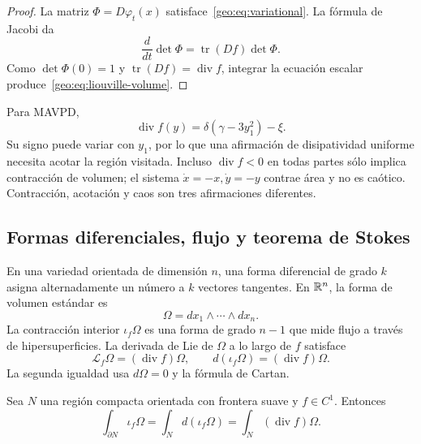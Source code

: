 \begin{proof}
La matriz \(\Phi=D\varphi_t(x)\) satisface~\eqref{geo:eq:variational}. La
fórmula de Jacobi da
\[
 \frac{d}{dt}\det\Phi=\operatorname{tr}(Df)\det\Phi.
\]
Como
\(\det\Phi(0)=1\) y \(\operatorname{tr}(Df)=\operatorname{div}f\), integrar
la ecuación escalar produce~\eqref{geo:eq:liouville-volume}.
\end{proof}

Para MAVPD,
\begin{equation}
 \operatorname{div}f(y)=\delta(\gamma-3y_1^2)-\xi.
 \label{geo:eq:mavpd-divergence}
\end{equation}
Su signo puede variar con \(y_1\), por lo que una afirmación de disipatividad
uniforme necesita acotar la región visitada. Incluso
\(\operatorname{div}f<0\) en todas partes sólo implica contracción de volumen;
el sistema \(\dot x=-x,\dot y=-y\) contrae área y no es caótico. Contracción,
acotación y caos son tres afirmaciones diferentes.

\subsection{Formas diferenciales, flujo y teorema de Stokes}

En una variedad orientada de dimensión \(n\), una forma diferencial de grado
\(k\) asigna alternadamente un número a \(k\) vectores tangentes. En
\(\mathbb{R}^n\), la forma de volumen estándar es
\begin{equation}
 \Omega=dx_1\wedge\cdots\wedge dx_n.
 \label{geo:eq:volume-form}
\end{equation}
La contracción interior \(\iota_f\Omega\) es una forma de grado \(n-1\) que
mide flujo a través de hipersuperficies. La derivada de Lie de \(\Omega\) a lo
largo de \(f\) satisface
\begin{equation}
 \mathcal L_f\Omega=(\operatorname{div}f)\Omega,\qquad
 d(\iota_f\Omega)=(\operatorname{div}f)\Omega.
 \label{geo:eq:cartan-divergence}
\end{equation}
La segunda igualdad usa \(d\Omega=0\) y la fórmula de Cartan.

\begin{proposition}
Sea \(N\) una región compacta orientada con frontera suave y \(f\in C^1\).
Entonces
\begin{equation}
 \int_{\partial N}\iota_f\Omega
 =\int_N d(\iota_f\Omega)
 =\int_N(\operatorname{div}f)\Omega.
 \label{geo:eq:stokes-flux}
\end{equation}
\end{proposition}

